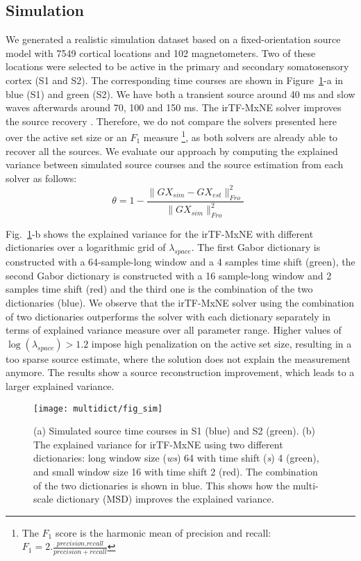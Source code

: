 \subsection{Simulation}
We generated a realistic simulation dataset based on a fixed-orientation source model with 7549 cortical locations and 102 magnetometers. Two of these locations were selected to be active in the primary and secondary somatosensory cortex (S1 and S2). The corresponding time courses are shown in Figure~\ref{fig:simulation}-a in blue (S1) and green (S2). We have both a transient source around 40 ms and slow waves afterwards around 70, 100 and 150 ms. The irTF-MxNE solver improves the source recovery \cite{irTF-MxNE}. Therefore, we do not compare the solvers presented here over the active set size or an $F_1$ measure \footnote{The $F_1$ score is the harmonic mean of precision and recall: $F_1=2.\frac{precision . recall}{precision + recall}$}, %
as both solvers are already able to recover all the sources. %
We evaluate our approach by computing  %
the explained variance between simulated source courses and the source estimation from each solver as follows:
\begin{equation}
	\theta = 1 - \frac{\|GX_{sim}-GX_{est}\|^2_{Fro}}{\|GX_{sim}\|^2_{Fro}} \enspace
\end{equation}

Fig.~\ref{fig:simulation}-b shows the explained variance for the irTF-MxNE with different dictionaries over a logarithmic grid of $\lambda_{space}$. The first Gabor dictionary is constructed with a 64-sample-long window and a 4 samples time shift (green), the second Gabor dictionary is constructed with a 16 sample-long window and 2 samples time shift (red) and the third one is the combination of the two dictionaries (blue). We observe that the irTF-MxNE solver using the combination of two dictionaries outperforms the solver with each dictionary separately in terms of explained variance measure over all parameter range. Higher values of $\log(\lambda_{space})>1.2$ impose high penalization on the active set size, resulting in a too sparse source estimate, where the solution does not explain the measurement anymore. The results show a source reconstruction improvement, which leads to a larger explained variance.

\begin{figure}
\centering
	\texttt{[image: multidict/fig\_sim]}
    \caption{(a) Simulated source time courses in S1 (blue) and S2 (green). (b) The explained variance for irTF-MxNE using two different dictionaries: long window size (\textit{ws}) 64 with time shift (\textit{s}) 4 (green), and small window size 16 with time shift 2 (red). The combination of the two dictionaries is shown in blue. This shows how the multi-scale dictionary (MSD) improves the explained variance.}
    \label{fig:simulation}
\end{figure}

